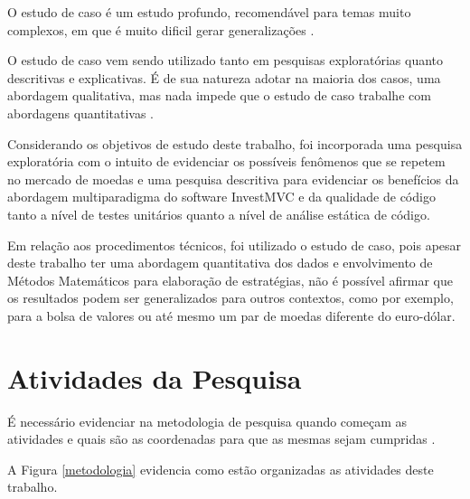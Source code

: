 O estudo de caso é um estudo profundo, recomendável para temas muito complexos, em que é muito dificil gerar generalizações \cite[pág.~33]{fonseca2002}.

O estudo de caso vem sendo utilizado tanto em pesquisas exploratórias quanto descritivas e explicativas. É de sua natureza adotar na maioria dos casos, uma abordagem qualitativa, mas nada impede que o estudo de caso trabalhe com abordagens quantitativas \cite[pág.~22]{yin}.

Considerando os objetivos de estudo deste trabalho, foi incorporada uma pesquisa exploratória com o intuito de evidenciar os possíveis fenômenos que se repetem no mercado de moedas e uma pesquisa descritiva para evidenciar os benefícios da abordagem multiparadigma do software InvestMVC e da qualidade de código tanto a nível de testes unitários quanto a nível de análise estática de código.

Em relação aos procedimentos técnicos, foi utilizado o estudo de caso, pois apesar deste trabalho ter uma abordagem quantitativa dos dados e envolvimento de Métodos Matemáticos para elaboração de estratégias, não é possível afirmar que os resultados podem ser generalizados para outros contextos, como por exemplo, para a bolsa de valores ou até mesmo um par de moedas diferente do euro-dólar.

\section{Atividades da Pesquisa}

É necessário evidenciar na metodologia de pesquisa quando começam as atividades e quais são as coordenadas para que as mesmas sejam cumpridas \cite{forcon2014}.

A Figura \ref{metodologia} evidencia como estão organizadas as atividades deste trabalho.

